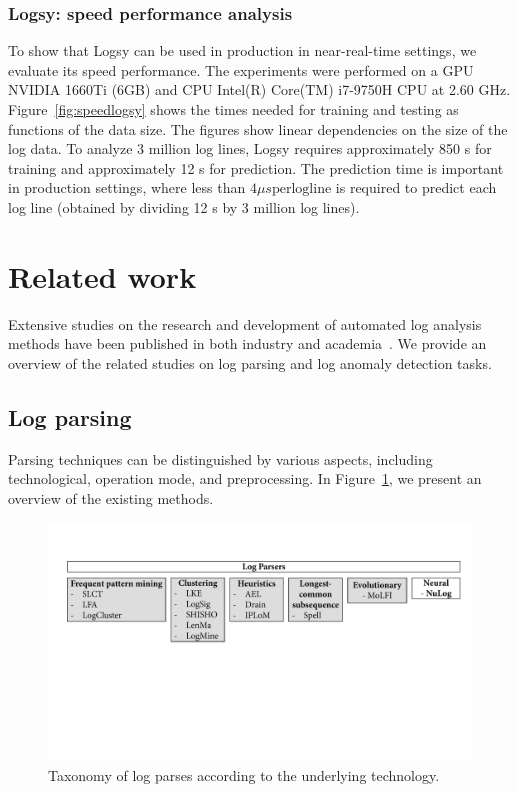 \subsubsection{Logsy: speed performance analysis}
To show that Logsy can be used in production in near-real-time settings, we evaluate its speed performance. The experiments were performed on a GPU NVIDIA 1660Ti (6GB) and CPU Intel(R) Core(TM) i7-9750H CPU at 2.60 GHz. Figure~\ref{fig:speedlogsy} shows the times needed for training and testing as functions of the data size. The figures show linear dependencies on the size of the log data. To analyze 3 million log lines, Logsy requires approximately 850 s for training and approximately 12 s for prediction. The prediction time is important in production settings, where less than $4 \mu s \mathrm{per log line}$ is required to predict each log line (obtained by dividing 12 s by 3 million log lines).


\section{Related work}
Extensive studies on the research and development of automated log analysis methods have been published in both industry and academia~\cite{zhu2019tools, he2016evaluation,shang2014log}. We provide an overview of the related studies on log parsing and log anomaly detection tasks.

\subsection{Log parsing}
Parsing techniques can be distinguished by various aspects, including technological, operation mode, and preprocessing. In Figure~\ref{fig:taxonomyparsing}, we present an overview of the existing methods.

\begin{figure}[htbp]
\centerline{\includegraphics[width=1.0\textwidth]{gfx/chap4/figure_parser_taxonomy.pdf}}
\caption{Taxonomy of log parses according to the underlying technology.}
\label{fig:taxonomyparsing}
\end{figure}


